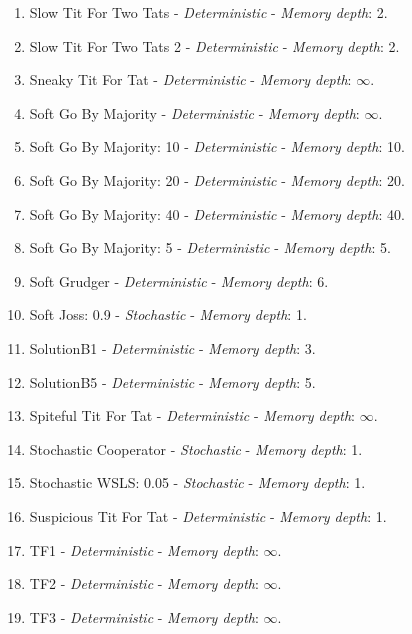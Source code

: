\documentclass[10pt,letterpaper]{article}
\begin{document}
\begin{enumerate}
\item Slow Tit For Two Tats - \textit{Deterministic} - \textit{Memory depth}: 2. \cite{axelrodproject}
\item Slow Tit For Two Tats 2 - \textit{Deterministic} - \textit{Memory depth}: 2. \cite{Prison1998}
\item Sneaky Tit For Tat - \textit{Deterministic} - \textit{Memory depth}: \(\infty\). \cite{axelrodproject}
\item Soft Go By Majority - \textit{Deterministic} - \textit{Memory depth}: \(\infty\). \cite{Axelrod1984, Mittal2009}
\item Soft Go By Majority: 10 - \textit{Deterministic} - \textit{Memory depth}: 10. \cite{axelrodproject}
\item Soft Go By Majority: 20 - \textit{Deterministic} - \textit{Memory depth}: 20. \cite{axelrodproject}
\item Soft Go By Majority: 40 - \textit{Deterministic} - \textit{Memory depth}: 40. \cite{axelrodproject}
\item Soft Go By Majority: 5 - \textit{Deterministic} - \textit{Memory depth}: 5. \cite{axelrodproject}
\item Soft Grudger - \textit{Deterministic} - \textit{Memory depth}: 6. \cite{Li2011}
\item Soft Joss: 0.9 - \textit{Stochastic} - \textit{Memory depth}: 1. \cite{Prison1998}
\item SolutionB1 - \textit{Deterministic} - \textit{Memory depth}: 3. \cite{Ashlock2015}
\item SolutionB5 - \textit{Deterministic} - \textit{Memory depth}: 5. \cite{Ashlock2015}
\item Spiteful Tit For Tat - \textit{Deterministic} - \textit{Memory depth}: \(\infty\). \cite{Prison1998}
\item Stochastic Cooperator - \textit{Stochastic} - \textit{Memory depth}: 1. \cite{Adami2013}
\item Stochastic WSLS: 0.05 - \textit{Stochastic} - \textit{Memory depth}: 1. \cite{axelrodproject}
\item Suspicious Tit For Tat - \textit{Deterministic} - \textit{Memory depth}: 1. \cite{Beaufils1997, Hilbe2013}
\item TF1 - \textit{Deterministic} - \textit{Memory depth}: \(\infty\). \cite{axelrodproject}
\item TF2 - \textit{Deterministic} - \textit{Memory depth}: \(\infty\). \cite{axelrodproject}
\item TF3 - \textit{Deterministic} - \textit{Memory depth}: \(\infty\). \cite{axelrodproject}

\end{enumerate}
\end{document}
